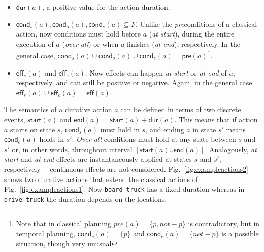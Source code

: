 \documentclass[runningheads]{llncs}
\newcommand{\pre}{\mathsf{pre}}    %
\newcommand{\eff}{\mathsf{eff}}    %
\newcommand{\cond}{\mathsf{cond}}  %
\newcommand{\dur}{\mathsf{dur}}    %
\newcommand{\start}{\mathsf{start}}%
\newcommand{\en}{\mathsf{end}}     %
\begin{document}
\begin{itemize}

\item $\dur(a)$, a positive value for the action duration.

\item $\cond_s(a), \cond_o(a), \cond_e(a) \subseteq F$. Unlike the \emph{pre}conditions of a classical action, now conditions must hold before $a$ ({\em at start}), during the entire execution of $a$ ({\em over all}) or when $a$ finishes ({\em at end}), respectively. In the general case, $\cond_s(a) \cup \cond_o(a) \cup \cond_e(a) = \pre(a)$\footnote{Note that in classical planning $pre(a)=\{p,not-p\}$ is contradictory, but in temporal planning, $\cond_s(a)=\{p\}$ and $\cond_e(a)=\{not-p\}$ is a possible situation, though very unusual}.


\item $\eff_s(a)$ and $\eff_e(a)$. Now effects can happen {\em at start} or {\em at end} of $a$, respectively, and can still be positive or negative. Again, in the general case $\eff_s(a) \cup \eff_e(a) = \eff(a)$.

\end{itemize}



The semantics of a durative action $a$ can be defined in terms of two discrete events, $\start(a)$ and $\en(a)=\start(a)+\dur(a)$. This means that if action $a$ starts on state $s$, $\cond_s(a)$ must hold in $s$, and ending $a$ in state $s'$ means $\cond_e(a)$ holds in $s'$. {\em Over all} conditions must hold at any state between $s$ and $s'$ or, in other words, throughout interval $[\start(a)..\en(a)]$.
Analogously, {\em at start} and {\em at end} effects are instantaneously applied at states $s$ and $s'$, respectively ---continuous effects are not considered.
Fig.~\ref{fig:exampleactions2} shows two durative actions that extend the classical actions of Fig.~\ref{fig:exampleactions1}. Now \texttt{board-truck} has a fixed duration whereas in \texttt{drive-truck} the duration depends on the locations.
\end{document}
